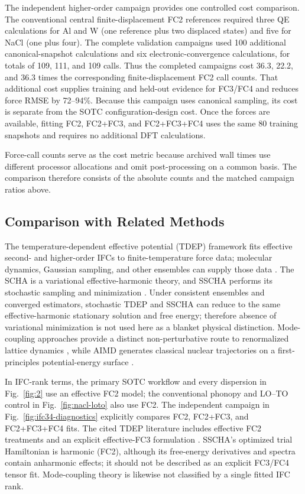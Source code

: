 \documentclass[aps,prb,reprint,amsmath,amssymb,floatfix]{revtex4-2}
\begin{document}
\color{revisionblue}
The independent higher-order campaign provides one controlled cost comparison.
The conventional central finite-displacement FC2 references required three QE
calculations for Al and W (one reference plus two displaced states) and five for
NaCl (one plus four). The complete validation campaigns used 100 additional
canonical-snapshot calculations and six electronic-convergence calculations,
for totals of 109, 111, and 109 calls. Thus the completed campaigns cost 36.3,
22.2, and 36.3 times the corresponding finite-displacement FC2 call counts.
That additional cost supplies training and held-out evidence for FC3/FC4 and
reduces force RMSE by 72--94\%. Because this campaign uses canonical sampling,
its cost is separate from the SOTC configuration-design cost. Once
the forces are available, fitting FC2, FC2+FC3, and FC2+FC3+FC4 uses the same
80 training snapshots and requires no additional DFT calculations.
\color{black}

\color{revisionblue}
Force-call counts serve as the cost metric because archived wall times use
different processor allocations and omit post-processing on a common basis.
The comparison therefore consists of the absolute counts and the matched
campaign ratios above.
\color{black}

\subsection{Comparison with Related
Methods}\label{comparison-with-related-methods}

\color{revisionblue}
The temperature-dependent effective potential (TDEP) framework fits effective
second- and higher-order IFCs to finite-temperature force data; molecular
dynamics, Gaussian sampling, and other ensembles can supply those data
\cite{ref5,ref6,ref10,ref52}. The SCHA is a variational effective-harmonic
theory, and SSCHA performs its stochastic sampling and minimization
\cite{ref7,ref8,ref50}. Under consistent ensembles and converged estimators,
stochastic TDEP and SSCHA can reduce to the same effective-harmonic stationary
solution and free energy; therefore absence of variational minimization is not
used here as a blanket physical distinction. Mode-coupling approaches provide a
distinct non-perturbative route to renormalized lattice dynamics \cite{ref51},
while AIMD generates classical nuclear trajectories on a first-principles
potential-energy surface \cite{ref9}.
\color{black}

\color{revisionblue}
In IFC-rank terms, the primary SOTC workflow and every dispersion in
Fig.~\ref{fig:2} use an effective FC2 model; the conventional phonopy and
LO--TO control in Fig.~\ref{fig:nacl-loto} also use FC2. The independent
campaign in Fig.~\ref{fig:ifc34-diagnostics} explicitly compares FC2,
FC2+FC3, and FC2+FC3+FC4 fits. The cited TDEP literature includes effective
FC2 treatments \cite{ref5,ref6} and an explicit effective-FC3 formulation
\cite{ref52}. SSCHA's optimized trial Hamiltonian is harmonic (FC2), although
its free-energy derivatives and spectra contain anharmonic effects; it should
not be described as an explicit FC3/FC4 tensor fit. Mode-coupling theory is
likewise not classified by a single fitted IFC rank.
\color{black}
\end{document}
